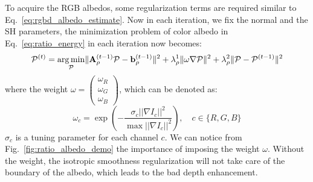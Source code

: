 To acquire the RGB albedos, some regularization terms are required similar to Eq.~\ref{eq:rgbd_albedo_estimate}. Now in each iteration, we fix the normal and the SH parameters, the minimization problem of color albedo in Eq.~\ref{eq:ratio_energy} in each iteration now becomes:
\begin{equation}\label{eq:ratio_albedo_refine}
    \mathcal{P}^{(t)} = 
    \operatorname*{arg\,min}_{\mathcal{P}} \lVert\mathbf{A}_{\rho}^{(t-1)}\mathcal{P} - \mathbf{b}_{\rho}^{(t-1)}\rVert^2 
    + \lambda_{\rho}^1 \lVert \omega \nabla \mathcal{P} \rVert^2  
    + \lambda_{\rho}^2 \lVert \mathcal{P} - \mathcal{P}^{(t-1)}\rVert^2
\end{equation}
where the weight $\omega = \begin{pmatrix} \omega_R\\ \omega_G\\ \omega_B \end{pmatrix}$, which can be denoted as:
\begin{equation}
\omega_c = \exp(- \frac{\sigma_c ||\nabla I_c||^2}{\max ||\nabla I_c||^2}), \quad c \in \{R,G,B\}
\end{equation}
$\sigma_c$ is a tuning parameter for each channel $c$.  
We can notice from Fig.~\ref{fig:ratio_albedo_demo} the importance of imposing the weight $\omega$.
Without the weight, the isotropic smoothness regularization will not take care of the boundary of the albedo, which leads to the bad depth enhancement.

